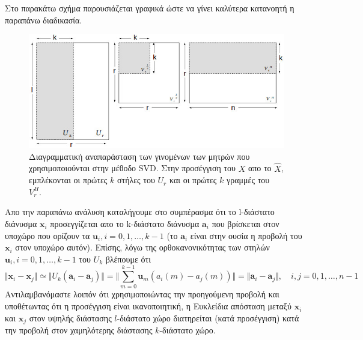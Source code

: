 \par
Στο παρακάτω σχήμα παρουσιάζεται γραφικά ώστε να γίνει καλύτερα κατανοητή η παραπάνω διαδικασία. \\
\vspace*{6cm}
\begin{figure}[h]
\centering
\includegraphics[scale=0.7]{figs/1.jpg}
\newline
\caption{Διαγραμματική αναπαράσταση των γινομένων των μητρών που χρησιμοποιούνται στην μέθοδο \textlatin{SVD}. Στην προσέγγιση του $X$ απο το $\hat{X}$, εμπλέκονται οι πρώτες $k$ στήλες του $U_{r}$ και οι πρώτες $k$ γραμμές του $V_{r}^{H}.$} 
\end{figure}
\par
\vspace*{2cm}
Απο την παραπάνω ανάλυση καταλήγουμε στο συμπέρασμα ότι το \textlatin{l}-διάστατο διάνυσμα $ \mathbf{x}_{i} $ προσεγγίζεται απο το \textlatin{k}-διάστατο διάνυσμα $ \mathbf{a}_{i} $ που βρίσκεται στον υποχώρο που ορίζουν τα $ \mathbf{u}_{i},i=0,1,\ldots,k-1$ (το $ \mathbf{a}_{i}$ είναι στην ουσία η προβολή του $ \mathbf{x}_{i} $ στον υποχώρο αυτόν). Επίσης, λόγω της ορθοκανονικότητας των στηλών $ \mathbf{u}_{i},i=0,1,\ldots,k-1 $ του $ U_{k} $ βλέπουμε ότι
\newline\hspace*{\fill}
\begin{equation}
	\Vert \mathbf{x}_{i}-\mathbf{x}_{j} \Vert \simeq \Vert U_{k}(\mathbf{a}_{i}-\mathbf{a}_{j}) \Vert = \Vert \sum_{m=0}^{k-1} \mathbf{u}_{m} (a_{i}(m)-a_{j}(m)) \Vert = \Vert \mathbf{a}_{i}-\mathbf{a}_{j}\Vert, \quad i,j=0,1,\ldots,n-1
\end{equation}
\hspace*{\fill}\newline
Αντιλαμβανόμαστε λοιπόν ότι χρησιμοποιώντας την προηγούμενη προβολή και υποθέτωντας ότι η προσέγγιση είναι ικανοποιητική, η Ευκλείδια απόσταση μεταξύ $ \mathbf{x}_{i} $ και $ \mathbf{x}_{j} $ στον υψηλής διάστασης $l$-διάστατο χώρο διατηρείται (κατά προσέγγιση) κατά την προβολή στον χαμηλότερης διάστασης $k$-διάστατο χώρο.
